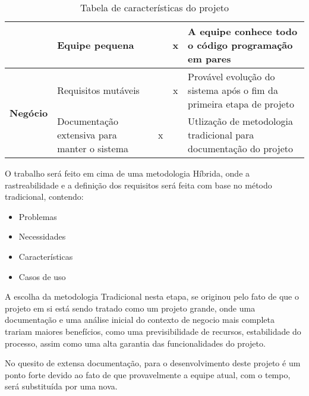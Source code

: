 \begin{table}[h]
\begin{tabular}{|p{2cm}|p{5cm}|c|c|p{4cm}|}
                 &
                Equipe pequena &
                 &
                x &
                A equipe conhece todo o código programação em pares
                \\
                \hline
        \multirow{2}{*}{
            \textbf{Negócio}}
                 &
                Requisitos mutáveis &
                 &
                x &
                Provável evolução do sistema após o fim da primeira etapa de projeto
                \\
                \cline{2-5}
                 &
                Documentação extensiva para manter o sistema &
                x &
                 &
                Utlização de metodologia tradicional para documentação do projeto
                \\
                \hline
    \end{tabular}
    \caption{Tabela de características do projeto}
    \label{tab:caracteristcas_do_projeto}
\end{table}

O trabalho será feito em cima de uma metodologia Híbrida, onde a rastreabilidade e a definição dos requisitos será feita com base no método 
tradicional, contendo:

\begin{itemize}
    \item{Problemas}
    \item{Necessidades}
    \item{Características}
    \item{Casos de uso}
\end{itemize}

A escolha da metodologia Tradicional nesta etapa, se originou pelo fato de que o projeto em si está sendo tratado como um projeto grande, onde uma documentação e uma análise inicial do contexto de negocio mais completa trariam maiores benefícios, como uma previsibilidade de recursos, estabilidade do processo, assim como uma alta garantia das funcionalidades do projeto.

No quesito de extensa documentação, para o desenvolvimento deste projeto é um ponto forte devido ao fato de que provavelmente a equipe atual, com o tempo, será substituída por uma nova.

